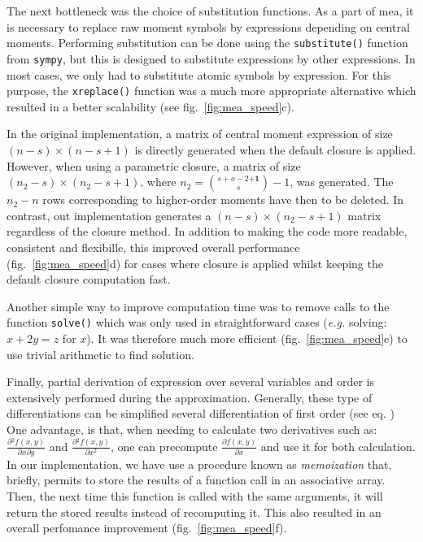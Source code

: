 \documentclass[11pt,a4paper]{article}
\newcommand{\sympy}{\texttt{sympy}}
\newcommand{\eg}{\emph{e.g.}}
\newcommand{\citationneeded}[2][]{\todo[color=brown, fancyline, #1]{\textbf{Citation Needed:} #2}}
\begin{document}
The next bottleneck was the choice of substitution functions.
As a part of \gls{mea}, it is necessary to replace raw moment symbols by expressions depending on central moments.
Performing substitution can be done using the \texttt{substitute()} function from \sympy, but this is designed to substitute expressions by other expressions.
In most cases, we only had to substitute atomic symbols by expression.
For this purpose, the \texttt{xreplace()} function was a much more appropriate alternative which resulted in a better scalability (see fig.~\ref{fig:mea_speed}c).

In the original implementation, a matrix of central moment expression of size $(n-s) \times (n-s + 1)$ is directly generated when the default closure is applied.
However, when using a parametric closure, a matrix of size $(n_2-s) \times (n_2-s + 1)$, where $n_2={{s+o-2 \mathbf{+1}} \choose {s}} -1$, was generated.
The $n_2 - n$ rows corresponding to higher-order moments have then to be deleted.
In contrast, out implementation generates a $(n-s) \times (n_2-s + 1)$ matrix regardless of the closure method.
In addition to making the code more readable, consistent and flexibille, this improved overall performance (fig.~\ref{fig:mea_speed}d) 
for cases where closure is applied whilst keeping the default closure computation fast.

Another simple way to improve computation time was to remove calls to the function \texttt{solve()} which was only used in straightforward cases
(\eg{} solving: $x + 2y = z$ for $x$).
It was therefore much more efficient (fig.~\ref{fig:mea_speed}e) to use trivial arithmetic to find solution.

Finally, partial derivation of expression over several variables and order is extensively performed during the approximation.
Generally, these type of differentiations can be simplified several differentiation of first order (see eq. \citationneeded{eq})
One advantage, is that, when needing to calculate two derivatives such as: $\frac{\partial{} ^ 2 f(x,y)}{\partial{} x \partial{} y}$ and $\frac{\partial{} ^ 2 f(x,y)}{\partial{} x^2}$,
one can precompute $\frac{\partial{} f(x,y)}{\partial{} x}$ and use it for both calculation.
In our implementation, we have use a procedure known as \emph{memoization} that, briefly, permits to store the results of a function call in an associative array.
Then, the next time this function is called with the same arguments, it will return the stored results instead of recomputing it.
This also resulted in an overall perfomance improvement (fig.~\ref{fig:mea_speed}f).
\end{document}
